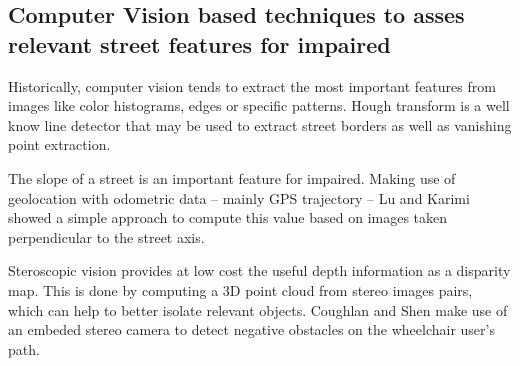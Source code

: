 \documentclass[10pt,conference,a4paper]{IEEEtran}
\begin{document}
\subsection{Computer Vision based techniques to asses relevant street features for impaired}
Historically, computer vision tends to extract the most important features from images like color histograms, edges \cite{canny_computational_1986} or specific patterns. %
Hough transform is a well know line detector that may be used to extract street borders %
\cite{kiryati_probabilistic_1991} 
as well as vanishing point extraction. %


The slope of a street is an important feature for impaired. Making use of geolocation with odometric data \--- mainly GPS trajectory \--- Lu and Karimi \cite{lu_real-time_2015} showed a simple approach to compute this value based on images taken perpendicular to the street axis. 

Steroscopic vision %
provides at low cost the useful depth information as a disparity map. This is done by computing a 3D point cloud from stereo images pairs, which can help to better isolate relevant objects.
Coughlan and Shen \cite{coughlan_terrain_2007} %
make use of an embeded stereo camera to detect negative obstacles on the wheelchair user's path. 
\end{document}
